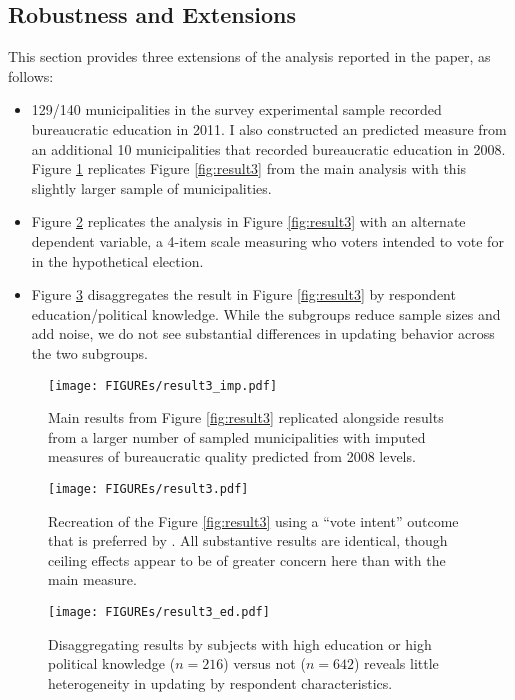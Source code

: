 \documentclass[11pt,english]{article}
\begin{document}
\subsection*{Robustness and Extensions}
This section provides three extensions of the analysis reported in the paper, as follows:
\begin{itemize}
\item 129/140 municipalities in the survey experimental sample recorded bureaucratic education in 2011. I also constructed an predicted measure from an additional 10 municipalities that recorded bureaucratic education in 2008. Figure \ref{fig:imp_bq} replicates Figure \ref{fig:result3} from the main analysis with this slightly larger sample of municipalities.
\item Figure \ref{fig:voteintent} replicates the analysis in Figure \ref{fig:result3} with an alternate dependent variable, a 4-item scale measuring who voters intended to vote for in the hypothetical election.
\item Figure \ref{fig:respondent_ed} disaggregates the result in Figure \ref{fig:result3} by respondent education/political knowledge. While the subgroups reduce sample sizes and add noise, we do not see substantial differences in updating behavior across the two subgroups. 
\end{itemize}
\begin{figure}[H]
\centering
\texttt{[image: FIGUREs/result3\_imp.pdf]}
\caption{Main results from Figure \ref{fig:result3} replicated alongside results from a larger number of sampled municipalities with imputed measures of bureaucratic quality predicted from 2008 levels.}\label{fig:imp_bq}
\end{figure}

\begin{figure}[H]
\centering
\texttt{[image: FIGUREs/result3.pdf]}
\caption{Recreation of the Figure \ref{fig:result3} using a ``vote intent'' outcome that is preferred by \citet{weitzshapirowinters2016}. All substantive results are identical, though ceiling effects appear to be of greater concern here than with the main measure.}\label{fig:voteintent}
\end{figure}

\begin{figure}[H]
\centering
\texttt{[image: FIGUREs/result3\_ed.pdf]}
\caption{Disaggregating results by subjects with high education or high political knowledge ($n = 216$) versus not ($n = 642$) reveals little heterogeneity in updating by respondent characteristics.}\label{fig:respondent_ed}
\end{figure}
\clearpage
\end{document}
